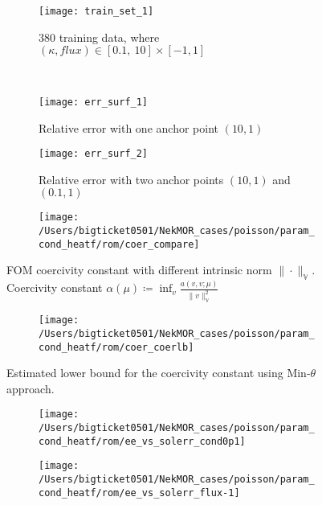 \begin{figure}[!h]
     \centering
     \begin{subfigure}[b]{0.5\textwidth}
         \centering
         \texttt{[image: train\_set\_1]}
         \caption{$380$ training data, where $(\kappa, flux) \in [0.1,~10] \times [-1, 1]$}
         \label{fig:6_a}
     \end{subfigure}\\
     \begin{subfigure}[b]{0.45\textwidth}
         \centering
         \texttt{[image: err\_surf\_1]}
         \caption{Relative error with one anchor point $(10, 1)$}
         \label{fig:6_b}
     \end{subfigure}
     \hfill
     \begin{subfigure}[b]{0.45\textwidth}
         \centering
         \texttt{[image: err\_surf\_2]}
         \caption{Relative error with two anchor points $(10, 1)$ and $(0.1, 1)$}
         \label{fig:6_c}
     \end{subfigure}
     \caption{}
      \label{fig:6}
\end{figure}

\begin{figure}[!h]
     \centering
     \begin{subfigure}[b]{0.45\textwidth}
         \centering
         \texttt{[image: /Users/bigticket0501/NekMOR\_cases/poisson/param\_cond\_heatf/rom/coer\_compare]}
     \end{subfigure}
     \caption{FOM coercivity constant with different intrinsic norm
     $\|\cdot\|_{\mathbb{V}}$. Coercivity constant $\alpha(\mu) \coloneqq
     \inf_{v} \frac{a(v,v;\mu)}{\|v\|^2_{\mathbb{V}}}$}
\end{figure}

\begin{figure}[!h]
     \centering
     \begin{subfigure}[b]{0.45\textwidth}
         \centering
         \texttt{[image: /Users/bigticket0501/NekMOR\_cases/poisson/param\_cond\_heatf/rom/coer\_coerlb]}
     \end{subfigure}
     \caption{Estimated lower bound for the coercivity constant using Min-$\theta$ approach.}
\end{figure}

\begin{figure}[!h]
     \centering
     \begin{subfigure}[b]{0.45\textwidth}
         \centering
         \texttt{[image: /Users/bigticket0501/NekMOR\_cases/poisson/param\_cond\_heatf/rom/ee\_vs\_solerr\_cond0p1]}
     \end{subfigure}
     \hfill
     \begin{subfigure}[b]{0.45\textwidth}
         \centering
         \texttt{[image: /Users/bigticket0501/NekMOR\_cases/poisson/param\_cond\_heatf/rom/ee\_vs\_solerr\_flux-1]}
     \end{subfigure}
\end{figure}

